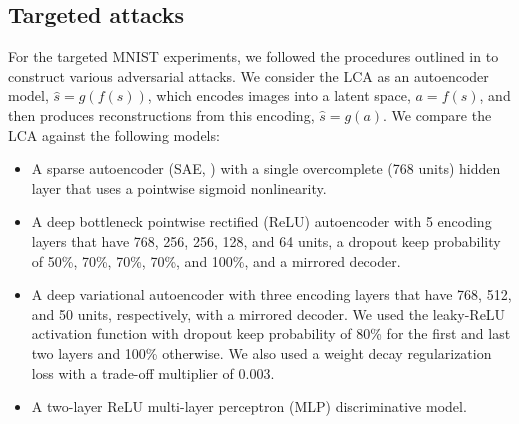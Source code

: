 \subsection{Targeted attacks}\label{sec:ch4_mnist_experiments}
For the targeted MNIST experiments, we followed the procedures outlined in \parencite{kos2018adversarial, kurakin2016adversarial, carlini2017towards} to construct various adversarial attacks. We consider the LCA as an autoencoder model, $\hat{s}=g(f(s))$, which encodes images into a latent space, $a=f(s)$, and then produces reconstructions from this encoding, $\hat{s}=g(a)$. We compare the LCA against the following models:


\begin{itemize}
  \item A sparse autoencoder (SAE, \cite{ng2011sparse}) with a single overcomplete (768 units) hidden layer that uses a pointwise sigmoid nonlinearity.
  \item A deep bottleneck pointwise rectified (ReLU) \parencite{hahnloser2000digital, nair2010rectified} autoencoder with 5 encoding layers that have 768, 256, 256, 128, and 64 units, a dropout keep probability of 50\%, 70\%, 70\%, 70\%, and 100\%, and a mirrored decoder.
  \item A deep variational autoencoder \parencite{kingma2013auto} with three encoding layers that have 768, 512, and 50 units, respectively, with a mirrored decoder. We used the leaky-ReLU activation function \parencite{maas2013rectifier} with dropout keep probability of 80\% for the first and last two layers and 100\% otherwise. We also used a weight decay regularization loss with a trade-off multiplier of 0.003. 
  \item A two-layer ReLU multi-layer perceptron (MLP) discriminative model.
\end{itemize}

